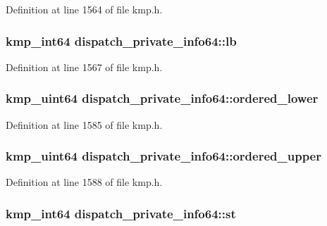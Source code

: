 Definition at line 1564 of file kmp.\-h.

\hypertarget{structdispatch__private__info64_a07d1113d5e87589745d971fd53df7e54}{
\subsubsection[{lb}]{\setlength{\rightskip}{0pt plus 5cm}kmp\-\_\-int64 dispatch\-\_\-private\-\_\-info64\-::lb}}\label{structdispatch__private__info64_a07d1113d5e87589745d971fd53df7e54}


Definition at line 1567 of file kmp.\-h.

\hypertarget{structdispatch__private__info64_a7612d73d58d16d478854817bc4a7673f}{
\subsubsection[{ordered\-\_\-lower}]{\setlength{\rightskip}{0pt plus 5cm}kmp\-\_\-uint64 dispatch\-\_\-private\-\_\-info64\-::ordered\-\_\-lower}}\label{structdispatch__private__info64_a7612d73d58d16d478854817bc4a7673f}


Definition at line 1585 of file kmp.\-h.

\hypertarget{structdispatch__private__info64_a65c09035eab7c34a886d023316f73ca6}{
\subsubsection[{ordered\-\_\-upper}]{\setlength{\rightskip}{0pt plus 5cm}kmp\-\_\-uint64 dispatch\-\_\-private\-\_\-info64\-::ordered\-\_\-upper}}\label{structdispatch__private__info64_a65c09035eab7c34a886d023316f73ca6}


Definition at line 1588 of file kmp.\-h.

\hypertarget{structdispatch__private__info64_a6f3f169d5b0c93c223f58177e6beae2c}{
\subsubsection[{st}]{\setlength{\rightskip}{0pt plus 5cm}kmp\-\_\-int64 dispatch\-\_\-private\-\_\-info64\-::st}}\label{structdispatch__private__info64_a6f3f169d5b0c93c223f58177e6beae2c}


